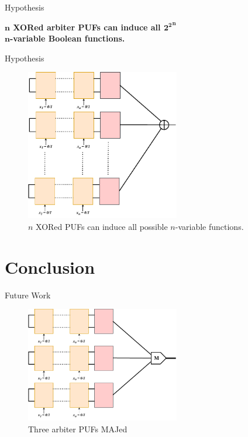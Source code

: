 \documentclass[10pt, compress]{beamer}
\begin{document}
\begin{frame}{Hypothesis}
    \begin{center}
        \LARGE\textbf{$\mathbf{n}$ XORed arbiter PUFs can induce all $\mathbf{{2^2}^n}$\\$\mathbf{n}$-variable Boolean functions.}
    \end{center}
\end{frame}

\begin{frame}{Hypothesis}
    \begin{figure}
        \centering
        \includegraphics[width=0.6\textwidth]{figures/puf_n_xor.pdf}
        \caption{$n$ XORed PUFs can induce all possible $n$-variable functions.}
    \end{figure}
\end{frame}

\section{Conclusion}

\begin{frame}{Future Work}
    \begin{figure}
        \centering
        \includegraphics[width=0.6\textwidth]{figures/puf_3_maj.pdf}
        \caption{Three arbiter PUFs MAJed}
    \end{figure}
\end{frame}
\end{document}
